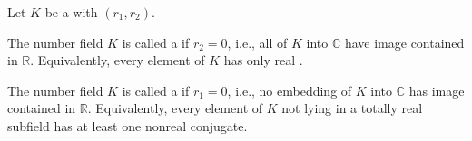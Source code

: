 \begin{definition} \label{definition:totally_real_and_totally_imaginary_number_fields}
Let $K$ be a  with  $(r_1, r_2)$.

The number field $K$ is called a  if $r_2 = 0$, i.e., all  of $K$ into $\mathbb{C}$ have image contained in $\mathbb{R}$. Equivalently, every element of $K$ has only real .

The number field $K$ is called a  if $r_1 = 0$, i.e., no embedding of $K$ into $\mathbb{C}$ has image contained in $\mathbb{R}$. Equivalently, every element of $K$ not lying in a totally real subfield has at least one nonreal conjugate.
\end{definition}
